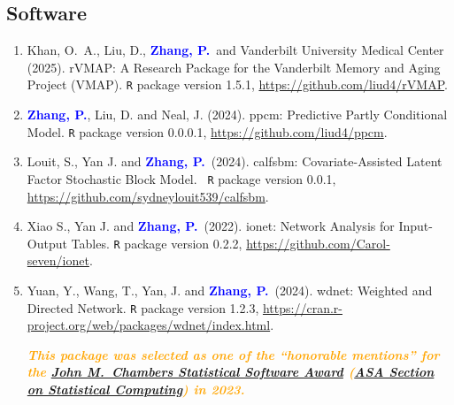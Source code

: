 \documentclass[12pt]{article}
\newcommand{\PZnot}{\textcolor{blue}{\textbf{Zhang, P.}}}
\newcommand{\orange}[1]{\textcolor{orange}{#1}}
\begin{document}
	\subsection*{Software}
	\begin{enumerate}
		\item {\sc Khan, O.\, A., Liu, D.}, \PZnot\ and {\sc Vanderbilt 
		University Medical Center} (2025). rVMAP: A Research Package for the 
		Vanderbilt Memory and Aging Project (VMAP). {\tt R} package version 
		1.5.1, \url{https://github.com/liud4/rVMAP}.
		
		\item \PZnot, {\sc Liu, D.} and {\sc Neal, J.} (2024).
		ppcm: Predictive Partly Conditional Model. {\tt R} package version 
		0.0.0.1, \url{https://github.com/liud4/ppcm}.
		
		\item{\sc Louit, S., Yan J.} and \PZnot\ (2024).
		calfsbm: Covariate-Assisted Latent Factor Stochastic Block Model. {\tt 
		R} package version 0.0.1, 
		\url{https://github.com/sydneylouit539/calfsbm}.
		
		\item{\sc Xiao S., Yan J.} and \PZnot\ (2022).
		ionet: Network Analysis for Input-Output Tables. {\tt R} 
		package version 0.2.2, 
		\url{https://github.com/Carol-seven/ionet}.
		
		\item {\sc Yuan, Y., Wang, T., Yan, J.} and \PZnot\ (2024). 
		wdnet: Weighted and Directed Network. {\tt R} package 
		version 
		1.2.3, 
		\url{https://cran.r-project.org/web/packages/wdnet/index.html}.
		
		\orange{\bf \em This package was selected as one of the 
		``honorable mentions'' for the  
		\href{https://community.amstat.org/jointscsg-section/awards/john-m-chambers}{John
		 M.\ Chambers Statistical Software Award} 
		 (\href{https://community.amstat.org/jointscsg-section/home}{ASA
		  Section on Statistical Computing}) in 2023.}
	\end{enumerate}
	
\end{document}
